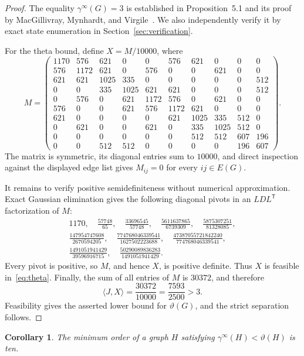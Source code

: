 \documentclass[11pt]{article}
\newtheorem{corollary}[theorem]{Corollary}
\begin{document}
\begin{proof}
The equality \(\gamma^\infty(G)=3\) is established in Proposition~5.1 and
its proof by MacGillivray, Mynhardt, and Virgile~\cite{mmv}.  We also
independently verify it by exact state enumeration in
Section~\ref{sec:verification}.

For the theta bound, define \(X=M/10000\), where
\begingroup
\scriptsize
\[
M=\begin{pmatrix}
1170&576&621&0&0&576&621&0&0&0\\
576&1172&621&0&576&0&0&621&0&0\\
621&621&1025&335&0&0&0&0&0&512\\
0&0&335&1025&621&621&0&0&0&512\\
0&576&0&621&1172&576&0&621&0&0\\
576&0&0&621&576&1172&621&0&0&0\\
621&0&0&0&0&621&1025&335&512&0\\
0&621&0&0&621&0&335&1025&512&0\\
0&0&0&0&0&0&512&512&607&196\\
0&0&512&512&0&0&0&0&196&607
\end{pmatrix}.
\]
\endgroup
The matrix is symmetric, its diagonal entries sum to \(10000\), and direct
inspection against the displayed edge list gives \(M_{ij}=0\) for every
\(ij\in E(G)\).

It remains to verify positive semidefiniteness without numerical
approximation.  Exact Gaussian elimination gives the following diagonal
pivots in an \(LDL^{\mathsf T}\) factorization of \(M\):
\[
\begin{gathered}
1170,\quad
\frac{57748}{65},\quad
\frac{33696545}{57748},\quad
\frac{5611637865}{6739309},\quad
\frac{5875307251}{81328085},\\
\frac{147954747608}{2670594205},\quad
\frac{774768046339541}{1627502223688},\quad
\frac{47387055721842240}{774768046339541},\\
\frac{1491051941429}{39596916715},\quad
\frac{50290089836283}{1491051941429}.
\end{gathered}
\]
Every pivot is positive, so \(M\), and hence \(X\), is positive definite.
Thus \(X\) is feasible in~\eqref{eq:theta}.  Finally, the sum of all entries
of \(M\) is \(30372\), and therefore
\[
 \langle J,X\rangle
 =\frac{30372}{10000}
 =\frac{7593}{2500}
 >3.
\]
Feasibility gives the asserted lower bound for \(\vartheta(G)\), and the
strict separation follows.
\end{proof}

\begin{corollary}\label{cor:minimal}
The minimum order of a graph \(H\) satisfying
\(\gamma^\infty(H)<\vartheta(H)\) is ten.
\end{corollary}
\end{document}

